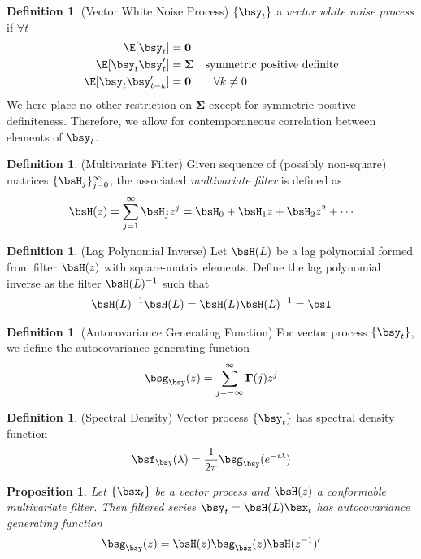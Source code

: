 \documentclass[12pt]{article}
\theoremstyle{plain}
\newtheorem{prop}[thm]{Proposition}
\theoremstyle{definition}
\newtheorem{defn}[thm]{Definition}
\theoremstyle{remark}
\newcommand{\bsSigma}{\boldsymbol{\Sigma}}
\newcommand{\bsGamma}{\boldsymbol{\Gamma}}
\renewcommand{\bso}{\boldsymbol{0}}
\begin{document}
\begin{defn}(Vector White Noise Process)
$\{\bsy_t\}$ a \emph{vector white noise process} if $\forall t$
\begin{align*}
  \E[\bsy_t] &= \bso
  \\
  \E[\bsy_t\bsy_t'] &= \bsSigma
  \quad\text{symmetric positive definite}
  \\
  \E[\bsy_t\bsy_{t-k}']
  &= \bso \qquad \forall k\neq 0
\end{align*}
We here place no other restriction on $\bsSigma$ except for symmetric
positive-definiteness. Therefore, we allow for contemporaneous
correlation between elements of $\bsy_t$.
\end{defn}

\begin{defn}(Multivariate Filter)
Given sequence of (possibly non-square) matrices
$\{\bsH_j\}_{j=0}^\infty$, the associated
\emph{multivariate filter}
is defined as
\begin{align*}
  \bsH(z)
  = \sum_{j=1}^\infty \bsH_j z^j
  = \bsH_0 + \bsH_1 z + \bsH_2z^2 + \cdots
\end{align*}
\end{defn}

\begin{defn}(Lag Polynomial Inverse)
Let $\bsH(L)$ be a lag polynomial formed from filter $\bsH(z)$ with
square-matrix elements. Define the lag polynomial inverse as the filter
$\bsH(L)^{-1}$ such that
\begin{align*}
  \bsH(L)^{-1}\bsH(L) =
  \bsH(L)\bsH(L)^{-1} = \bsI
\end{align*}
\end{defn}

\begin{defn}(Autocovariance Generating Function)
For vector process $\{\bsy_t\}$, we define the autocovariance generating
function
\begin{align*}
  \bsg_{\bsy}(z) = \sum_{j=-\infty}^\infty \bsGamma(j)z^j
\end{align*}
\end{defn}

\begin{defn}(Spectral Density)
Vector process $\{\bsy_t\}$ has spectral density function
\begin{align*}
  \bsf_{\bsy}(\lambda) = \frac{1}{2\pi} \bsg_{\bsy}(e^{-i\lambda})
\end{align*}
\end{defn}

\begin{prop}
Let $\{\bsx_t\}$ be a vector process and $\bsH(z)$ a conformable
multivariate filter. Then filtered series
$\bsy_t = \bsH(L)\bsx_t$
has autocovariance generating function
\begin{align*}
  \bsg_{\bsy}(z) = \bsH(z)\bsg_{\bsx}(z)\bsH(z^{-1})'
\end{align*}
\end{prop}
\end{document}
